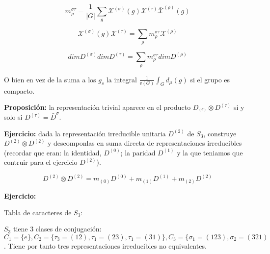 \documentclass{article}
\begin{document}
$$m_\rho ^{\sigma \tau} =\frac{1}{|G|} \sum _g \mathcal{X}^{(\sigma)}(g)\mathcal{X}^{(\tau)}\bar{\mathcal{X}}^{(\rho)}(g)$$

$$\mathcal{X}^{(\sigma)}(g)\mathcal{X}^{(\tau)}= \sum _\rho m_\rho ^{\sigma \tau}\mathcal{X}^{(\rho)}$$

$$dimD^{(\sigma)}dim D^{(\tau)}=\sum _\rho m_\rho ^{\sigma \tau} dimD^{(\rho)}$$
    
O bien en vez de la suma a los $g_s$ la integral $\frac{1}{v(G)}\int _G d_\mu (g)$ si el grupo es compacto.

\smallskip
\textbf{Proposición:} la representación trivial aparece en el producto $D_^{(\sigma)}\otimes D^{(\tau)}$ si y solo si $D^{(\tau)}= \bar{D}^{\sigma}$.

\smallskip
\textbf{Ejercicio:} dada la representación irreducible unitaria $D^{(2)}$ de $S_3$, construye $D^{(2)}\otimes D^{(2)}$ y descomponlas en suma directa de representaciones irreducibles (recordar que eran: la identidad, $D^{(0)}$; la paridad $D^{(1)}$ y la que teniamos que contruir para el ejercicio $D^{(2)}$).

$$D^{(2)}\otimes D^{(2)}=m_{(0)}D^{(0)}+m_{(1)}D^{(1)}+m_{(2)}D^{(2)}$$

\textbf{Ejercicio:}
    
    \smallskip
    Tabla de caracteres de $S_3$:
    
    \smallskip
    $S_3$ tiene 3 clases de conjugación: $C_1=\lbrace e \rbrace, C_2= \lbrace \tau _3=(12),\tau _1=(23), \tau _1=(31)\rbrace, C_3=\lbrace \sigma _1=(123),\sigma _2=(321)$. Tiene por tanto tres representaciones irreducibles no equivalentes.
    
\end{document}
